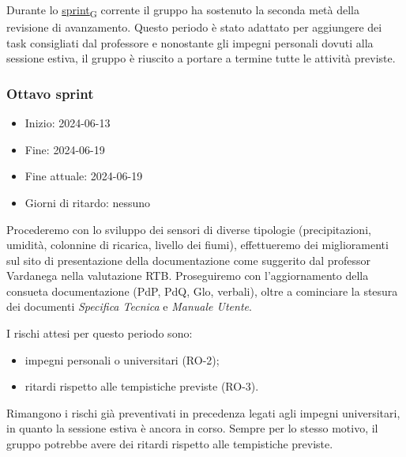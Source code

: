 Durante lo \href{https://7last.github.io/docs/pb/documentazione-interna/glossario\#sprint}{sprint\textsubscript{G}} corrente il gruppo ha sostenuto la seconda metà della revisione di avanzamento. Questo periodo è stato adattato per aggiungere dei task consigliati dal professore e nonostante gli impegni personali dovuti alla sessione estiva, il gruppo è riuscito a portare a termine tutte le attività previste.


\newpage
\subsubsection{Ottavo sprint}
\begin{itemize}
	\item Inizio: 2024-06-13
	\item Fine: 2024-06-19
	\item Fine attuale: 2024-06-19
	\item Giorni di ritardo: nessuno
\end{itemize}

Procederemo con lo sviluppo dei sensori di diverse tipologie (precipitazioni, umidità, colonnine di ricarica, livello dei fiumi), effettueremo dei miglioramenti sul sito di presentazione della documentazione come suggerito dal professor Vardanega nella valutazione RTB. Proseguiremo con l'aggiornamento della consueta documentazione (PdP, PdQ, Glo, verbali), oltre a cominciare la stesura dei documenti \textit{Specifica Tecnica} e \textit{Manuale Utente}.

I rischi attesi per questo periodo sono:
\begin{itemize}
	\item impegni personali o universitari (RO-2);
	\item ritardi rispetto alle tempistiche previste (RO-3).
\end{itemize}
Rimangono i rischi già preventivati in precedenza legati agli impegni universitari, in quanto la sessione estiva è ancora in corso. Sempre per lo stesso motivo, il gruppo potrebbe avere dei ritardi rispetto alle tempistiche previste.

